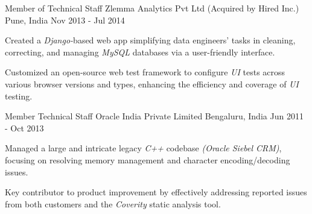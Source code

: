 \begin{cventries}
\cventry
{Member of Technical Staff} %
{Zlemma Analytics Pvt Ltd (Acquired by Hired Inc.)} %
{Pune, India} %
{Nov 2013 - Jul 2014} %
{ %
\begin{cvitems}
\item {Created a \textit{Django-}based web app simplifying data engineers' tasks in cleaning, correcting, and managing \textit{MySQL} databases via a user-friendly interface.}
\item {Customized an open-source web test framework to configure \textit{UI} tests across various browser versions and types, enhancing the efficiency and coverage of \textit{UI} testing.}
\end{cvitems}
}
\cventry
{Member Technical Staff} %
{Oracle India Private Limited} %
{Bengaluru, India} %
{Jun 2011 - Oct 2013} %
{ %
	\begin{cvitems}
		\item {Managed a large and intricate legacy \textit{C++} codebase \textit{(Oracle Siebel CRM)}, focusing on resolving memory management and character encoding/decoding issues.}
		\item {Key contributor to product improvement by effectively addressing reported issues from both customers and the \textit{Coverity} static analysis tool.}
	\end{cvitems}
}

\end{cventries}
